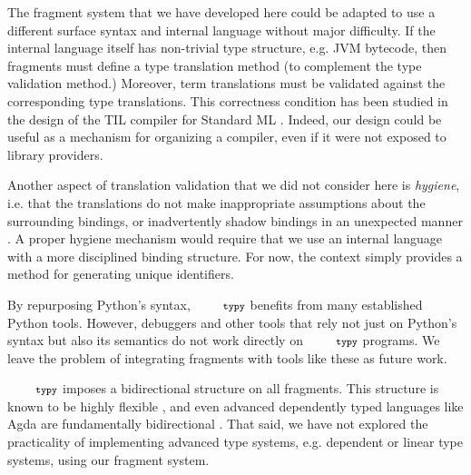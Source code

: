 \documentclass[10pt]{sigplanconf}
\newcommand{\typy}{\texttt{\footnotesize typy}}
\begin{document}
The fragment system that we have developed here could be adapted to use a different surface syntax and internal language without major difficulty. If the internal language itself has non-trivial type structure, e.g. JVM bytecode, then fragments must define a type translation method (to complement the type validation method.) Moreover, term translations must be validated against the corresponding type translations. This correctness condition has been studied in the design of the TIL compiler for Standard ML \cite{tarditi+:til-OLD}. Indeed, our design could be useful as a mechanism for organizing a compiler, even if it were not exposed to library providers.

Another aspect of translation validation that we did not consider here is \emph{hygiene}, i.e. that the translations do not make inappropriate assumptions about the surrounding bindings, or inadvertently shadow bindings in an unexpected manner \cite{Kohlbecker86a,DBLP:conf/popl/Adams15}. A proper hygiene mechanism would require that we use an internal language with a more disciplined binding structure. For now, the context simply provides a method for generating unique identifiers.

By repurposing Python's syntax, $\typy$ benefits from many established Python tools. However, debuggers and other tools that rely not just on Python's syntax but also its semantics do not work directly on $\typy$ programs. We leave the problem of integrating fragments with tools like these as future work. %


$\typy$ imposes a bidirectional structure on all fragments. This structure is known to be highly flexible \cite{conf/icfp/DunfieldK13}, and even advanced dependently typed languages like Agda are fundamentally bidirectional \cite{norell2007towards}. That said, we have not explored the practicality of implementing advanced type systems, e.g. dependent or linear type systems, using our fragment system.  %
\end{document}
